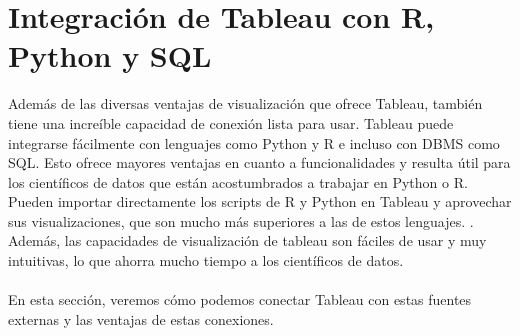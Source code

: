 \documentclass[12pt,letterpaper]{article}
\begin{document}
\section{Integración de Tableau con R, Python y SQL}
Además de las diversas ventajas de visualización que ofrece Tableau, también tiene una increíble
capacidad de conexión lista para usar. Tableau puede integrarse fácilmente con lenguajes como Python
y R e incluso con DBMS como SQL. Esto ofrece mayores ventajas en cuanto a funcionalidades y
resulta útil para los científicos de datos que están acostumbrados a trabajar en Python o R. Pueden
importar directamente los scripts de R y Python en Tableau y aprovechar sus visualizaciones, que son
mucho más superiores a las de estos lenguajes. . Además, las capacidades de visualización de tableau
son fáciles de usar y muy intuitivas, lo que ahorra mucho tiempo a los científicos de datos.
\\\\En esta sección, veremos cómo podemos conectar Tableau con estas fuentes externas y las ventajas de
estas conexiones.
\end{document}
